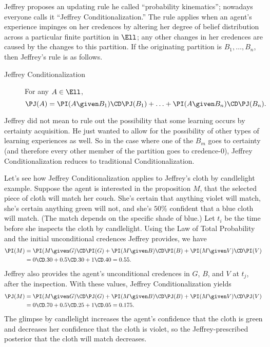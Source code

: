 Jeffrey proposes an updating rule he called ``probability kinematics''; nowadays everyone calls it ``Jeffrey Conditionalization.'' The rule applies when an agent's experience impinges on her credences by altering her degree of belief distribution across a particular finite partition in $\Ell$; any other changes in her credences are caused by the changes to this partition. If the originating partition is $B_1, \ldots, B_n$, then Jeffrey's rule is as follows.
\begin{description}
\item[Jeffrey Conditionalization]{For any $A \in \Ell$, $$\PJ(A)=\PI(A \given B_1) \CD \PJ(B_1) + \ldots + \PI(A \given B_n) \CD \PJ(B_n).$$}
\end{description}
Jeffrey did not mean to rule out the possibility that some learning occurs by certainty acquisition. He just wanted to allow for the possibility of other types of learning experiences as well. So in the case where one of the $B_m$ goes to certainty (and therefore every other member of the partition goes to credence-$0$), Jeffrey Conditionalization reduces to traditional Conditionalization.

Let's see how Jeffrey Conditionalization applies to Jeffrey's cloth by candlelight example. Suppose the agent is interested in the proposition $M$, that the selected piece of cloth will match her couch.  She's certain that anything violet will match, she's certain anything green will not, and she's $50\%$ confident that a blue cloth will match. (The match depends on the specific shade of blue.) Let $t_i$ be the time before she inspects the cloth by candlelight. Using the Law of Total Probability and the initial unconditional credences Jeffrey provides, we have
\begin{equation}
\begin{split}
\PI(M) &= \PI(M \given G) \CD \PI(G) + \PI(M \given B) \CD \PI(B) + \PI(M \given V) \CD \PI(V) \\
		&= 0 \CD .30 + 0.5 \CD .30 + 1 \CD .40 = 0.55.
\end{split}
\end{equation}
Jeffrey also provides the agent's unconditional credences in $G$, $B$, and $V$ at $t_j$, after the inspection. With these values, Jeffrey Conditionalization yields
\begin{equation}
\begin{split}
\PJ(M) &= \PI(M \given G) \CD \PJ(G) + \PI(M \given B) \CD \PJ(B) + \PI(M \given V) \CD \PJ(V) \\
		&= 0 \CD .70 + 0.5 \CD .25 + 1 \CD .05 = 0.175.
\end{split}
\end{equation}
The glimpse by candlelight increases the agent's confidence that the cloth is green and decreases her confidence that the cloth is violet, so the Jeffrey-prescribed posterior that the cloth will match decreases.

